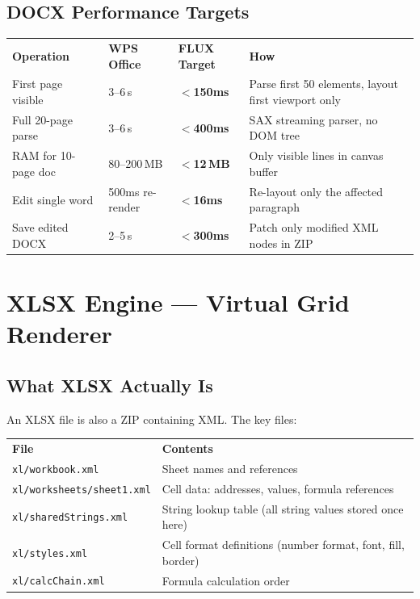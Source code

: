 \documentclass[12pt,a4paper]{report}
\newcommand{\ra}[1]{\renewcommand{\arraystretch}{#1}}
\newcommand{\TH}[1]{\rowcolor{P1}\color{white}\bfseries #1}
\newcommand{\PB}{\newpage}
\begin{document}
\section{DOCX Performance Targets}

\begin{center}\ra{1.35}
\begin{tabular}{L{4.4cm} C{2.6cm} C{2.4cm} L{4.4cm}}
\TH{Operation} & \TH{WPS Office} & \TH{FLUX Target} & \TH{How} \\
 First page visible & 3--6\,s & \textbf{$<$150ms} & Parse first 50 elements, layout first viewport only \\
 Full 20-page parse & 3--6\,s & \textbf{$<$400ms} & SAX streaming parser, no DOM tree \\
 RAM for 10-page doc & 80--200\,MB & \textbf{$<$12\,MB} & Only visible lines in canvas buffer \\
 Edit single word & 500ms re-render & \textbf{$<$16ms} & Re-layout only the affected paragraph \\
 Save edited DOCX & 2--5\,s & \textbf{$<$300ms} & Patch only modified XML nodes in ZIP \\
\end{tabular}
\end{center}

\PB

\chapter{XLSX Engine — Virtual Grid Renderer}

\section{What XLSX Actually Is}

An XLSX file is also a ZIP containing XML. The key files:

\begin{center}\ra{1.3}
\begin{tabular}{L{4.2cm} L{9.6cm}}
\TH{File} & \TH{Contents} \\
 \texttt{xl/workbook.xml} & Sheet names and references \\
 \texttt{xl/worksheets/sheet1.xml} & Cell data: addresses, values, formula references \\
 \texttt{xl/sharedStrings.xml} & String lookup table (all string values stored once here) \\
 \texttt{xl/styles.xml} & Cell format definitions (number format, font, fill, border) \\
 \texttt{xl/calcChain.xml} & Formula calculation order \\
\end{tabular}
\end{center}
\end{document}
